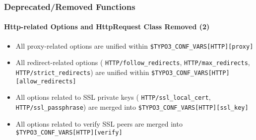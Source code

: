 \begin{frame}[fragile]
	\frametitle{Deprecated/Removed Functions}
	\framesubtitle{Http-related Options and HttpRequest Class Removed (2)}

	\begin{itemize}

		\item All proxy-related options are unified within\newline
			\small\texttt{\$TYPO3\_CONF\_VARS[HTTP][proxy]}\normalsize

		\item All redirect-related options
			(\small
				\texttt{HTTP/follow\_redirects},
				\texttt{HTTP/max\_redirects},
				\texttt{HTTP/strict\_redirects}\normalsize)
			are unified within
			\small
				\texttt{\$TYPO3\_CONF\_VARS[HTTP][allow\_redirects]}
			\normalsize

		\item All options related to SSL private keys
			(\small
				\texttt{HTTP/ssl\_local\_cert},
				\texttt{HTTP/ssl\_passphrase}\normalsize)
			are merged into
			\small
				\texttt{\$TYPO3\_CONF\_VARS[HTTP][ssl\_key]}
			\normalsize

		\item All options related to verify SSL peers are merged into
			\small
				\texttt{\$TYPO3\_CONF\_VARS[HTTP][verify]}
			\normalsize

	\end{itemize}

\end{frame}

